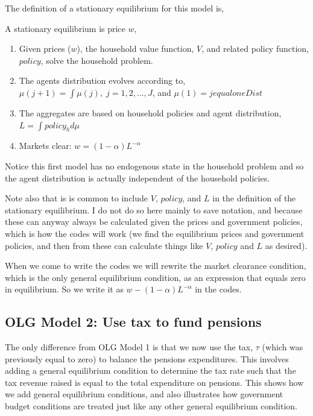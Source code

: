 The definition of a stationary equilibrium for this model is,
\begin{definition}
 A stationary equilibrium is price $w$,
 \begin{enumerate}
  \item Given prices ($w$), the household value function, $V$, and related policy function, $policy$, solve the household problem.
  \item The agents distribution evolves according to,
   \\  $\mu(j+1)=\int \mu(j), \; j=1,2,...,J$, and $\mu(1)=jequaloneDist$
  \item The aggregates are based on household policies and agent distribution,
   \\  $L=\int policy_h d\mu$
  \item Markets clear: $w=(1-\alpha)L^{-\alpha}$
 \end{enumerate}
\end{definition}
Notice this first model has no endogenous state in the household problem and so the agent distribution is actually independent of the household policies.

Note also that is is common to include $V$, $policy$, and $L$ in the definition of the stationary equilibrium. I do not do so here mainly to save notation, and because these can anyway always be calculated given the prices and government policies, which is how the codes will work (we find the equilibrium prices and government policies, and then from these can calculate things like $V$, $policy$ and $L$ as desired).

When we come to write the codes we will rewrite the market clearance condition, which is the only general equilibrium condition, as an expression that equals zero in equilibrium. So we write it as $w-(1-\alpha)L^{-\alpha}$ in the codes.

\subsection{OLG Model 2: Use tax to fund pensions}
The only difference from OLG Model 1 is that we now use the tax, $\tau$ (which was previously equal to zero) to balance the pensions expenditures. This involves adding a general equilibrium condition to determine the tax rate such that the tax revenue raised is equal to the total expenditure on pensions. This shows how we add general equilibrium conditions, and also illustrates how government budget conditions are treated just like any other general equilibrium condition.

